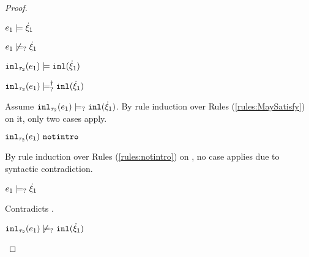 \begin{proof}
\begin{byCases}
\begin{byCases}
        \begin{byCases}
        \item[\csatisfy{e_1}{\hxi_1}]
            \begin{pfsteps*}
            \item $e_1 \models \dot{\xi}_1$  
            \item $e_1 \not\models_{?} \dot{\xi}_1$  
            \item $\mathtt{inl}_{\tau_2}({e_1}) \models \mathtt{inl}(\dot{\xi}_1)$  
            \item $\mathtt{inl}_{\tau_2}({e_1}) \models_{?}^{\dag} \mathtt{inl}(\dot{\xi}_1)$ 
            \end{pfsteps*}
            Assume $\mathtt{inl}_{\tau_2}({e_1}) \models_{?} \mathtt{inl}(\dot{\xi}_1)$. By rule induction over Rules (\ref{rules:MaySatisfy}) on it, only two cases apply.
            \begin{byCases}
            \item[\text{(\ref{rule:CMSNotIntro})}]
                \begin{pfsteps*}
                \item $\mathtt{inl}_{\tau_2}({e_1}) ~\mathtt{notintro}$  
                \end{pfsteps*}
                By rule induction over Rules (\ref{rules:notintro}) on , no case applies due to syntactic contradiction.
            \item[\text{(\ref{rule:CMSInl})}]
                \begin{pfsteps*}
                \item $e_1 \models_{?} \dot{\xi}_1$
                \end{pfsteps*}
                Contradicts .
            \end{byCases}
            \begin{pfsteps*}
            \item $\mathtt{inl}_{\tau_2}({e_1}) \not\models_{?} \mathtt{inl}(\dot{\xi}_1)$ 
            \end{pfsteps*}
            

\end{byCases}
\end{byCases}
\end{byCases}
\end{proof}
